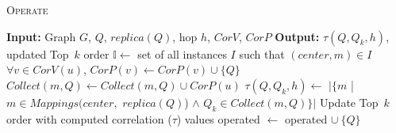 \begin{algorithm}%
	\caption{\textsc{Operate}}\label{algo:operate}
		\dontprintsemicolon
		\nonl \textbf{Input:} Graph $G$, $Q$, $replica(Q)$, hop $h$, $CorV$, $CorP$\;
		\nonl \textbf{Output:} $\tau({Q,Q_{k},h})$, updated {\sf Top\ $k$} order\;
		{
			$\mathbb{I}\leftarrow$ {set of all instances $I$ such that $(center, m)\in I$}\;
			{
				$\forall v \in CorV(u)$, $CorP(v)\leftarrow CorP(v) \cup \{Q\}$\;
				$Collect(m, Q) \leftarrow Collect(m, Q) \cup CorP(u)$\;	
			}						
		}
		{
			$\tau(Q, Q_k, h)\leftarrow$  $|\{m$ | $m\in Mappings(center,$ $replica(Q)$) $\wedge$ $Q_k\in Collect(m, Q)\}|$\;
		}
		Update {\sf Top\ $k$} order with computed correlation ($\tau$) values\;
		{\sf operated} $\leftarrow$ {\sf operated} $\cup \ \{Q\}$\;

\end{algorithm}

